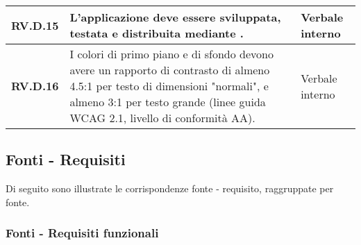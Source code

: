 \begin{adjustwidth}{-0.5cm}{-0.5cm}
\begin{longtable}{|P{3cm}|P{6,5cm}|>{\arraybackslash}P{4cm}|}
    \hline
    \textbf{RV.D.15} & L'applicazione deve essere sviluppata, testata e distribuita mediante . & Verbale interno \\
    \hline
    \textbf{RV.D.16} & I colori di primo piano e di sfondo devono avere un rapporto di contrasto di almeno 4.5:1 per testo di dimensioni "normali", e almeno 3:1 per testo grande (linee guida WCAG 2.1, livello di conformità AA). & Verbale interno \\
  \end{longtable}
\end{adjustwidth}
\egroup

\subsection{Fonti - Requisiti}
Di seguito sono illustrate le corrispondenze fonte - requisito, raggruppate per fonte.

\subsubsection{Fonti - Requisiti funzionali}

